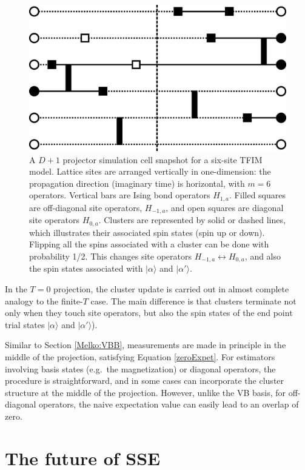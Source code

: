 \documentclass[vecphys]{svmult}
\begin{document}
\begin{figure}[t]
\centering
\includegraphics*[width=.85\textwidth]{zeroT_tfim.eps}
\caption[]{A $D+1$ projector simulation cell snapshot for a six-site TFIM model.  Lattice sites are arranged vertically in one-dimension: the propagation direction (imaginary time) is horizontal, with $m=6$ operators.  
Vertical bars are Ising bond operators $H_{1,a}$.  Filled squares are off-diagonal site operators, $H_{-1,a}$, and open squares are diagonal site operators $H_{0,a}$.
Clusters are represented by solid or dashed lines, which illustrates their associated spin states (spin up or down).  Flipping all the spins associated with a cluster can be done with probability 1/2.  This changes site operators $H_{-1,a} \leftrightarrow H_{0,a}$, and also the spin states associated with  $|\alpha \rangle$ and $|\alpha' \rangle$.}
\label{fig:5}      
\end{figure} 

In the $T=0$ projection, the cluster update is carried out in almost complete analogy to the finite-$T$ case.  The main difference is that clusters terminate not only when they touch site operators, but also the spin states of the end point trial states $|\alpha \rangle$ and $|\alpha' \rangle$).

Similar to Section \ref{Melko:VBB}, measurements are made in principle in the middle of the projection, satisfying Equation \ref{zeroExpet}.  
For estimators involving basis states (e.g.~the magnetization) or diagonal operators, the procedure is straightforward, and in some cases can incorporate the cluster structure at the middle of the projection.
However, unlike the VB basis, for off-diagonal operators, the naive expectation value can easily lead to an overlap of zero.


\section{The future of SSE}
\end{document}
